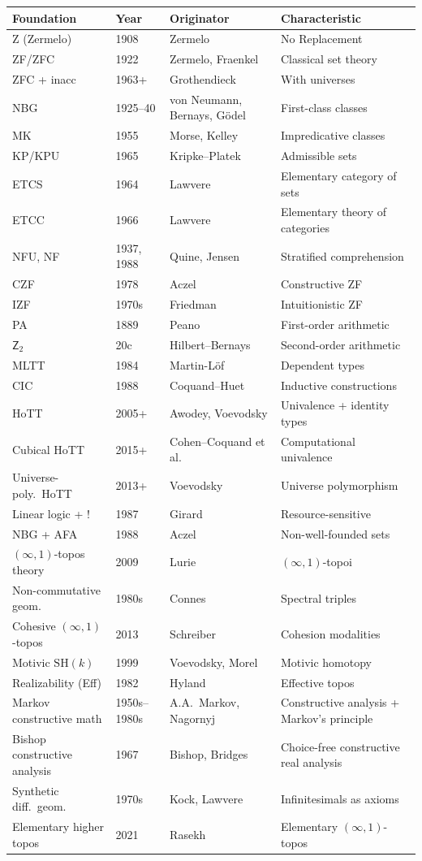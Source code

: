 \documentclass[11pt]{article}
\theoremstyle{plain}
\theoremstyle{definition}
\begin{document}
\begin{longtable}{@{}p{3.8cm}l p{4cm} p{4.6cm}@{}}
\toprule
Foundation & Year & Originator & Characteristic \\ \midrule
Z (Zermelo) & 1908 & Zermelo & No Replacement \\
ZF/ZFC & 1922 & Zermelo, Fraenkel & Classical set theory \\
ZFC + inacc & 1963+ & Grothendieck & With universes \\
NBG & 1925--40 & von Neumann, Bernays, G\"odel & First-class classes \\
MK & 1955 & Morse, Kelley & Impredicative classes \\
KP/KPU & 1965 & Kripke--Platek & Admissible sets \\
ETCS & 1964 & Lawvere & Elementary category of sets \\
ETCC & 1966 & Lawvere & Elementary theory of categories \\
NFU, NF & 1937, 1988 & Quine, Jensen & Stratified comprehension \\
CZF & 1978 & Aczel & Constructive ZF \\
IZF & 1970s & Friedman & Intuitionistic ZF \\
PA & 1889 & Peano & First-order arithmetic \\
$\mathsf{Z}_2$ & 20c & Hilbert--Bernays & Second-order arithmetic \\
MLTT & 1984 & Martin-L\"of & Dependent types \\
CIC & 1988 & Coquand--Huet & Inductive constructions \\
HoTT & 2005+ & Awodey, Voevodsky & Univalence + identity types \\
Cubical HoTT & 2015+ & Cohen--Coquand et al. & Computational univalence \\
Universe-poly.\ HoTT & 2013+ & Voevodsky & Universe polymorphism \\
Linear logic + ! & 1987 & Girard & Resource-sensitive \\
NBG + AFA & 1988 & Aczel & Non-well-founded sets \\
$(\infty, 1)$-topos theory & 2009 & Lurie & $(\infty, 1)$-topoi \\
Non-commutative geom.\ & 1980s & Connes & Spectral triples \\
Cohesive $(\infty, 1)$-topos & 2013 & Schreiber & Cohesion modalities \\
Motivic $\mathrm{SH}(k)$ & 1999 & Voevodsky, Morel & Motivic homotopy \\
Realizability (Eff) & 1982 & Hyland & Effective topos \\
Markov constructive math & 1950s--1980s & A.A.~Markov, Nagornyj & Constructive analysis + Markov's principle \\
Bishop constructive analysis & 1967 & Bishop, Bridges & Choice-free constructive real analysis \\
Synthetic diff.~geom.\ & 1970s & Kock, Lawvere & Infinitesimals as axioms \\
Elementary higher topos & 2021 & Rasekh & Elementary $(\infty, 1)$-topos \\
\bottomrule
\end{longtable}
\end{document}
